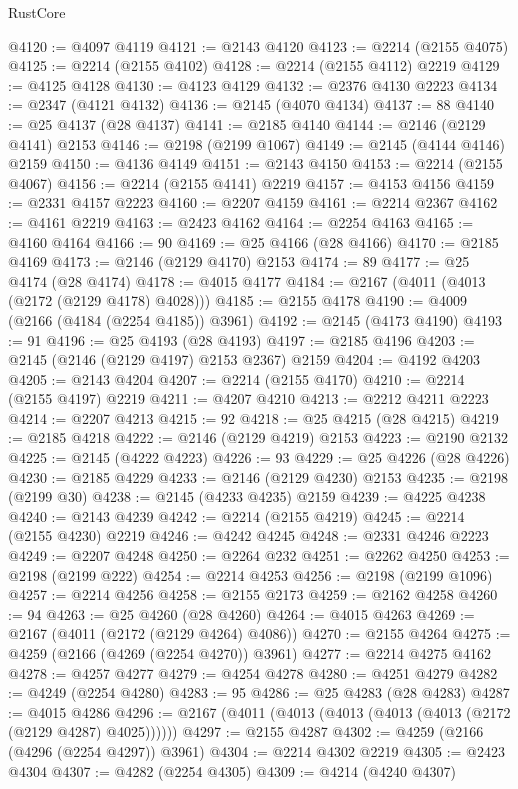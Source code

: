 \begin{lexlean}{RustCore}
\begin{coremodule}
@4120 := @4097 @4119
@4121 := @2143 @4120
@4123 := @2214 (@2155 @4075)
@4125 := @2214 (@2155 @4102)
@4128 := @2214 (@2155 @4112) @2219
@4129 := @4125 @4128
@4130 := @4123 @4129
@4132 := @2376 @4130 @2223
@4134 := @2347 (@4121 @4132)
@4136 := @2145 (@4070 @4134)
@4137 := 88
@4140 := @25 @4137 (@28 @4137)
@4141 := @2185 @4140
@4144 := @2146 (@2129 @4141) @2153
@4146 := @2198 (@2199 @1067)
@4149 := @2145 (@4144 @4146) @2159
@4150 := @4136 @4149
@4151 := @2143 @4150
@4153 := @2214 (@2155 @4067)
@4156 := @2214 (@2155 @4141) @2219
@4157 := @4153 @4156
@4159 := @2331 @4157 @2223
@4160 := @2207 @4159
@4161 := @2214 @2367
@4162 := @4161 @2219
@4163 := @2423 @4162
@4164 := @2254 @4163
@4165 := @4160 @4164
@4166 := 90
@4169 := @25 @4166 (@28 @4166)
@4170 := @2185 @4169
@4173 := @2146 (@2129 @4170) @2153
@4174 := 89
@4177 := @25 @4174 (@28 @4174)
@4178 := @4015 @4177
@4184 := @2167 (@4011 (@4013 (@2172 (@2129 @4178) @4028)))
@4185 := @2155 @4178
@4190 := @4009 (@2166 (@4184 (@2254 @4185)) @3961)
@4192 := @2145 (@4173 @4190)
@4193 := 91
@4196 := @25 @4193 (@28 @4193)
@4197 := @2185 @4196
@4203 := @2145 (@2146 (@2129 @4197) @2153 @2367) @2159
@4204 := @4192 @4203
@4205 := @2143 @4204
@4207 := @2214 (@2155 @4170)
@4210 := @2214 (@2155 @4197) @2219
@4211 := @4207 @4210
@4213 := @2212 @4211 @2223
@4214 := @2207 @4213
@4215 := 92
@4218 := @25 @4215 (@28 @4215)
@4219 := @2185 @4218
@4222 := @2146 (@2129 @4219) @2153
@4223 := @2190 @2132
@4225 := @2145 (@4222 @4223)
@4226 := 93
@4229 := @25 @4226 (@28 @4226)
@4230 := @2185 @4229
@4233 := @2146 (@2129 @4230) @2153
@4235 := @2198 (@2199 @30)
@4238 := @2145 (@4233 @4235) @2159
@4239 := @4225 @4238
@4240 := @2143 @4239
@4242 := @2214 (@2155 @4219)
@4245 := @2214 (@2155 @4230) @2219
@4246 := @4242 @4245
@4248 := @2331 @4246 @2223
@4249 := @2207 @4248
@4250 := @2264 @232
@4251 := @2262 @4250
@4253 := @2198 (@2199 @222)
@4254 := @2214 @4253
@4256 := @2198 (@2199 @1096)
@4257 := @2214 @4256
@4258 := @2155 @2173
@4259 := @2162 @4258
@4260 := 94
@4263 := @25 @4260 (@28 @4260)
@4264 := @4015 @4263
@4269 := @2167 (@4011 (@2172 (@2129 @4264) @4086))
@4270 := @2155 @4264
@4275 := @4259 (@2166 (@4269 (@2254 @4270)) @3961)
@4277 := @2214 @4275 @4162
@4278 := @4257 @4277
@4279 := @4254 @4278
@4280 := @4251 @4279
@4282 := @4249 (@2254 @4280)
@4283 := 95
@4286 := @25 @4283 (@28 @4283)
@4287 := @4015 @4286
@4296 := @2167 (@4011 (@4013 (@4013 (@4013 (@4013 (@2172 (@2129 @4287) @4025))))))
@4297 := @2155 @4287
@4302 := @4259 (@2166 (@4296 (@2254 @4297)) @3961)
@4304 := @2214 @4302 @2219
@4305 := @2423 @4304
@4307 := @4282 (@2254 @4305)
@4309 := @4214 (@4240 @4307)

\end{coremodule}
\end{lexlean}

